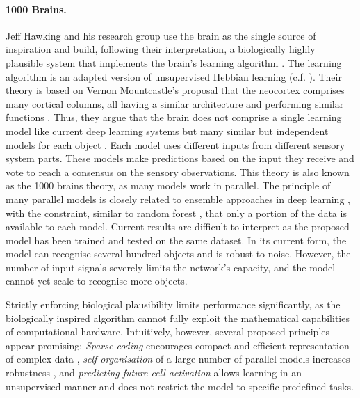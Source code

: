 \paragraph{1000 Brains.} Jeff Hawking and his research group use the brain as the single source of inspiration and build, following their interpretation, a biologically highly plausible system that implements the brain's learning algorithm . The learning algorithm is an adapted version of unsupervised Hebbian learning (c.f. ). Their theory is based on Vernon Mountcastle's proposal that the neocortex comprises many cortical columns, all having a similar architecture and performing similar functions . Thus, they argue that the brain does not comprise a single learning model like current deep learning systems but many similar but independent models for each object \cite{lewis_locations_2019}. Each model uses different inputs from different sensory system parts. These models make predictions based on the input they receive and vote to reach a consensus on the sensory observations.
This theory is also known as the 1000 brains theory, as many models work in parallel. The principle of many parallel models is closely related to ensemble approaches in deep learning , with the constraint, similar to random forest , that only a portion of the data is available to each model. Current results are difficult to interpret as the proposed model has been trained and tested on the same dataset. In its current form, the model can recognise several hundred objects and is robust to noise. However, the number of input signals severely limits the network's capacity, and the model cannot yet scale to recognise more objects. 

Strictly enforcing biological plausibility limits performance significantly, as the biologically inspired algorithm cannot fully exploit the mathematical capabilities of computational hardware. Intuitively, however, several proposed principles appear promising: \emph{Sparse coding} encourages compact and efficient representation of complex data , \emph{self-organisation} of a large number of parallel models increases robustness \cite{yang_survey_2023}, and \emph{predicting future cell activation} allows learning in an unsupervised manner and does not restrict the model to specific predefined tasks.

